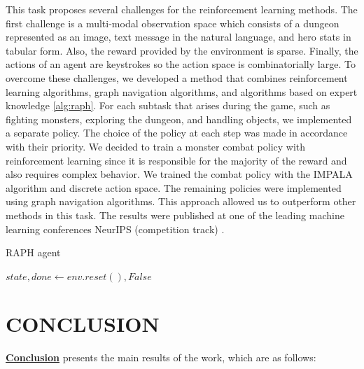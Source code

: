 This task proposes several challenges for the reinforcement learning methods. The first challenge is a multi-modal observation space which consists of a dungeon represented as an image, text message in the natural language, and hero stats in tabular form. Also, the reward provided by the environment is sparse. Finally, the actions of an agent are keystrokes so the action space is combinatorially large. To overcome these challenges, we developed a method that combines reinforcement learning algorithms, graph navigation algorithms, and algorithms based on expert knowledge \ref{alg:raph}. For each subtask that arises during the game, such as fighting monsters, exploring the dungeon, and handling objects, we implemented a separate policy. The choice of the policy at each step was made in accordance with their priority. We decided to train a monster combat policy with reinforcement learning since it is responsible for the majority of the reward and also requires complex behavior. We trained the combat policy with the IMPALA \cite{impala} algorithm and discrete action space. The remaining policies were implemented using graph navigation algorithms. This approach allowed us to outperform other methods in this task. The results were published at one of the leading machine learning conferences NeurIPS (competition track) \cite{confbib3}.

\begin{algorithm}[ht]
\caption{RAPH agent}\label{alg:raph}
$state, done \gets env.reset(), False$\;

\end{algorithm}


\FloatBarrier
\section*{\centering CONCLUSION}
\underline{\textbf{Conclusion}} presents the main results of the work, which are as follows:


